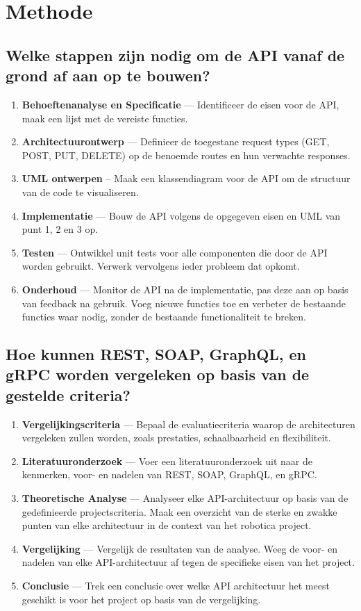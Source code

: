 \section{Methode}
\label{sec:methode}

\subsection{Welke stappen zijn nodig om de API vanaf de grond af aan op te bouwen?}

\begin{enumerate}
  \item \textbf{Behoeftenanalyse en Specificatie} --- Identificeer de eisen
  voor de API, maak een lijst met de vereiste functies.
  \item \textbf{Architectuurontwerp} --- Definieer de toegestane request types
  (GET, POST, PUT, DELETE) op de benoemde routes en hun verwachte responses.
  \item \textbf{UML ontwerpen} -- Maak een klassendiagram voor de API om de
  structuur van de code te visualiseren.
  \item \textbf{Implementatie} --- Bouw de API volgens de opgegeven eisen en UML
  van punt 1, 2 en 3 op.
  \item \textbf{Testen} --- Ontwikkel unit tests voor alle componenten die
  door de API worden gebruikt. Verwerk vervolgens ieder probleem dat opkomt.
  \item \textbf{Onderhoud} --- Monitor de API na de implementatie,
  pas deze aan op basis van feedback na gebruik. Voeg nieuwe
  functies toe en verbeter de bestaande functies waar nodig, zonder de
  bestaande functionaliteit te breken.
\end{enumerate}

\subsection{Hoe kunnen REST, SOAP, GraphQL, en gRPC worden vergeleken op basis van de gestelde criteria?}

\begin{enumerate}
  \item \textbf{Vergelijkingscriteria} --- Bepaal de
  evaluatiecriteria waarop de architecturen vergeleken zullen worden,
  zoals prestaties, schaalbaarheid en flexibiliteit.
  \item \textbf{Literatuuronderzoek} --- Voer een literatuuronderzoek uit naar de
  kenmerken, voor- en nadelen van REST, SOAP, GraphQL, en gRPC.
  \item \textbf{Theoretische Analyse} --- Analyseer elke API-architectuur op basis
  van de gedefinieerde projectscriteria. Maak een overzicht van de sterke en
  zwakke punten van elke architectuur in de context van het robotica project.
  \item \textbf{Vergelijking} --- Vergelijk de resultaten van de
  analyse. Weeg de voor- en nadelen van elke API-architectuur af tegen de
  specifieke eisen van het project.
  \item \textbf{Conclusie} --- Trek een conclusie over welke API architectuur
  het meest geschikt is voor het project op basis van de vergelijking.
\end{enumerate}
